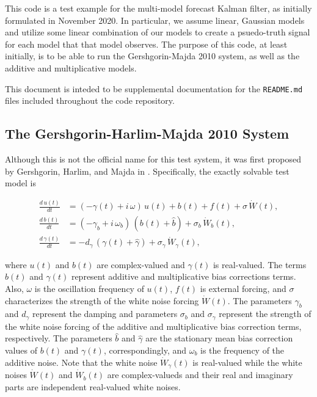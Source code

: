 This code is a test example for the multi-model forecast Kalman filter, as initially formulated in November 2020. In particular, we assume linear, Gaussian models and utilize some linear combination of our models to create a psuedo-truth signal for each model that that model observes. The purpose of this code, at least initially, is to be able to run the Gershgorin-Majda 2010 system, as well as the additive and multiplicative models.

This document is inteded to be supplemental documentation for the \texttt{README.md} files included throughout the code repository.

\subsection{The Gershgorin-Harlim-Majda 2010 System}

Although this is not the official name for this test system, it was first proposed by Gershgorin, Harlim, and Majda in \cite{Gershgorin10}. Specifically, the exactly solvable test model is

\begin{align}
	\frac{d\,u\left( t \right)}{dt} &= \left( -\gamma\left( t \right) + i\,\omega \right)\,u\left( t \right) + b\left( t \right) + f\left( t \right) + \sigma\,\dot{W}\left( t \right), \label{eqn:diff_b}\\
	\frac{d\,b\left( t \right)}{dt} &= \left( -\gamma_{b} + i\,\omega_{b} \right)\,\left( b\left( t \right) + \widehat{b} \right) + \sigma_{b}\,\dot{W}_{b}\left( t \right), \label{eqn:diff_gamma}\\
	\frac{d\,\gamma\left( t \right)}{dt} &= -d_{\gamma}\,\left( \gamma\left( t \right) + \widehat{\gamma} \right) + \sigma_{\gamma}\,\dot{W}_{\gamma}\left( t \right), \label{eqn:diff_u}
\end{align}

where $u\left( t \right)$ and $b\left( t \right)$ are complex-valued and $\gamma\left( t \right)$ is real-valued. The terms $b\left( t \right)$ and $\gamma\left( t \right)$ represent additive and multiplicative bias corrections terms. Also, $\omega$ is the oscillation frequency of $u\left( t \right)$, $f\left( t \right)$ is external forcing, and $\sigma$ characterizes the strength of the white noise forcing $\dot{W}\left( t \right)$. The parameters $\gamma_{b}$ and $d_{\gamma}$ represent the damping and parameters $\sigma_{b}$ and $\sigma_{\gamma}$ represent the strength of the white noise forcing of the additive and multiplicative bias correction terms, respectively. The parameters $\widehat{b}$ and $\widehat{\gamma}$ are the stationary mean bias correction values of $b\left( t \right)$ and $\gamma\left( t \right)$, correspondingly, and $\omega_{b}$ is the frequency of the additive noise. Note that the white noise $\dot{W}_{\gamma}\left( t \right)$ is real-valued while the white noises $\dot{W}\left( t \right)$ and $\dot{W}_{b}\left( t \right)$ are complex-valueds and their real and imaginary parts are independent real-valued white noises.

